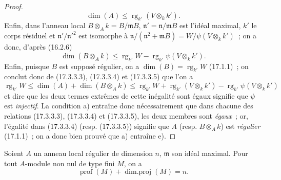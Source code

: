 \begin{proof}
\begin{equation}
\label{0.17.3.3.4-fr}
\tag{17.3.3.4}
  \dim(A)\leq\operatorname{rg}_{k'}(V\otimes_k k').
\end{equation}
Enfin, dans l'anneau local $B\otimes_A k=B/\mathfrak{m}B$,
$\mathfrak{n}'=\mathfrak{n}/\mathfrak{m}B$ est l'idéal maximal, $k'$ le corps
résiduel et $\mathfrak{n}'/\mathfrak{n}'^2$ est isomorphe à
$\mathfrak{n}/(\mathfrak{n}^2+\mathfrak{m}B)
=W/\psi(V\otimes_k k')$~; on a donc, d'après (16.2.6)
\begin{equation}
\label{0.17.3.3.5-fr}
\tag{17.3.3.5}
  \dim(B\otimes_A k)
  \leq\operatorname{rg}_{k'}W
  -\operatorname{rg}_{k'}\psi(V\otimes_k k').
\end{equation}
Enfin, puisque $B$ est supposé régulier, on a
$\dim(B)=\operatorname{rg}_{k'}W$ (17.1.1)~; on conclut donc de (17.3.3.3),
(17.3.3.4) et (17.3.3.5) que l'on a
\[
  \operatorname{rg}_{k'}W
  \leq\dim(A)+\dim(B\otimes_A k)
  \leq\operatorname{rg}_{k'}W
  +\operatorname{rg}_{k'}(V\otimes_k k')
  -\operatorname{rg}_{k'}\psi(V\otimes_k k')
\]
et dire que les deux termes extrêmes de cette inégalité sont égaux signifie
que $\psi$ est \emph{injectif}. La condition a) entraîne donc nécessairement
que dans chacune des relations (17.3.3.3), (17.3.3.4) et (17.3.3.5), les deux
membres sont \emph{égaux}~; or, l'égalité dans (17.3.3.4) (resp. (17.3.3.5))
signifie que $A$ (resp. $B\otimes_A k$) est \emph{régulier} (17.1.1)~; on a
donc bien prouvé que a) entraîne e).
\end{proof}

\begin{proposition}[17.3.4]
\label{0.17.3.4-fr}
Soient $A$ un anneau local régulier de dimension $n$, $\mathfrak{m}$ son idéal
maximal. Pour tout $A$-module non nul de type fini $M$, on a
\begin{equation}
\label{0.17.3.4.1-fr}
\tag{17.3.4.1}
  \operatorname{prof}(M)+\operatorname{dim.proj}(M)=n.
\end{equation}
\end{proposition}

